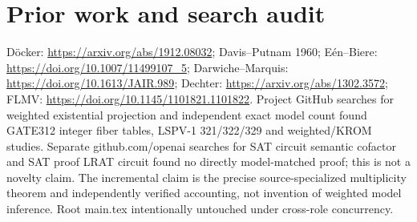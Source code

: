 \documentclass[11pt]{article}
\begin{document}
\section{Prior work and search audit}
D\"ocker: \url{https://arxiv.org/abs/1912.08032}; Davis--Putnam 1960; E\'en--Biere: \url{https://doi.org/10.1007/11499107_5}; Darwiche--Marquis: \url{https://doi.org/10.1613/JAIR.989}; Dechter: \url{https://arxiv.org/abs/1302.3572}; FLMV: \url{https://doi.org/10.1145/1101821.1101822}. Project GitHub searches for weighted existential projection and independent exact model count found GATE312 integer fiber tables, LSPV-1 321/322/329 and weighted/KROM studies. Separate github.com/openai searches for SAT circuit semantic cofactor and SAT proof LRAT circuit found no directly model-matched proof; this is not a novelty claim. The incremental claim is the precise source-specialized multiplicity theorem and independently verified accounting, not invention of weighted model inference. Root main.tex intentionally untouched under cross-role concurrency.
\end{document}

